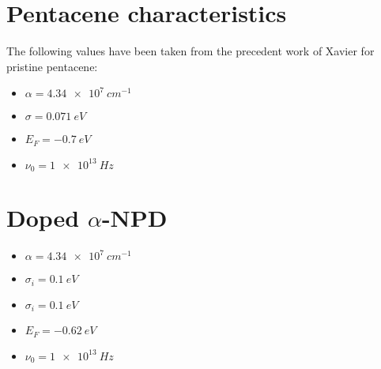 
\section{Pentacene characteristics \label{pentacene}}

The following values have been taken from the precedent work of Xavier \cite{xavier_thesis} for pristine pentacene:

\begin{itemize}
    \item $\alpha = \SI{4.34e7}{cm^{-1}}$
    \item $\sigma = \SI{0.071}{eV}$
    \item $E_F = \SI{-0.7}{eV}$
    \item $\nu_0 = \SI{1e13}{Hz}$
\end{itemize}

\section{Doped $\alpha$-NPD \label{alphanpd}}
\begin{itemize}
  \item $\alpha = \SI{4.34e7}{cm^{-1}}$
  \item $\sigma_i = \SI{0.1}{eV}$
  \item $\sigma_i = \SI{0.1}{eV}$
  \item $E_F = \SI{-0.62}{eV}$
  \item $\nu_0 = \SI{1e13}{Hz}$
\end{itemize}
